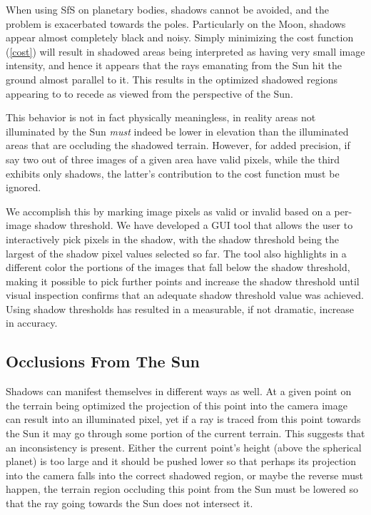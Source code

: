 \documentclass[12pt,oneside]{article}
\begin{document}
When using SfS on planetary bodies, shadows cannot be avoided, and the
problem is exacerbated towards the poles. Particularly on the Moon,
shadows appear almost completely black and noisy. Simply minimizing the
cost function (\ref{cost}) will result in shadowed areas being
interpreted as having very small image intensity, and hence it appears
that the rays emanating from the Sun hit the ground almost parallel to
it. This results in the optimized shadowed regions appearing to to
recede as viewed from the perspective of the Sun.

This behavior is not in fact physically meaningless, in reality areas
not illuminated by the Sun \textit{must} indeed be lower in elevation
than the illuminated areas that are occluding the shadowed terrain.
However, for added precision, if say two out of three images of a given
area have valid pixels, while the third exhibits only shadows, the
latter's contribution to the cost function must be ignored.

We accomplish this by marking image pixels as valid or invalid based on
a per-image shadow threshold. We have developed a GUI tool that allows
the user to interactively pick pixels in the shadow, with the shadow
threshold being the largest of the shadow pixel values selected so
far. The tool also highlights in a different color the portions of the
images that fall below the shadow threshold, making it possible to pick
further points and increase the shadow threshold until visual inspection
confirms that an adequate shadow threshold value was achieved. Using
shadow thresholds has resulted in a measurable, if not dramatic,
increase in accuracy.

\subsection{Occlusions From The Sun}

Shadows can manifest themselves in different ways as well. At a given
point on the terrain being optimized the projection of this point into
the camera image can result into an illuminated pixel, yet if a ray is
traced from this point towards the Sun it may go through some portion of
the current terrain. This suggests that an inconsistency is
present. Either the current point's height (above the spherical planet)
is too large and it should be pushed lower so that perhaps its
projection into the camera falls into the correct shadowed region, or
maybe the reverse must happen, the terrain region occluding this point
from the Sun must be lowered so that the ray going towards the Sun does not
intersect it. 
\end{document}
